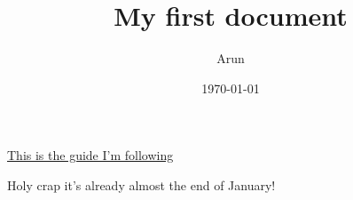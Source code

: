 \documentclass{article}
\title{My first document}
\date{\today}
\author{Arun}
\begin{document}
  \maketitle %
  \newpage %



  \href{https://www.latex-tutorial.com/tutorials/first-document/}{This is the guide I'm following}
  \newpage

  Holy crap it's already almost the end of January!
\end{document}
